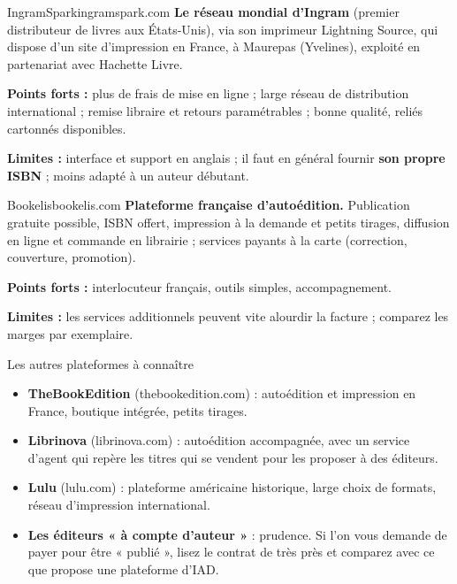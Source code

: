 \begin{fiche}{IngramSpark}{ingramspark.com}
\textbf{Le réseau mondial d’Ingram} (premier distributeur de livres aux
États-Unis), via son imprimeur Lightning Source, qui dispose d’un site
d’impression en France, à Maurepas (Yvelines), exploité en partenariat
avec Hachette Livre.\par
\textbf{Points forts :} plus de frais de mise en ligne ; large réseau
de distribution international ; remise libraire et retours
paramétrables ; bonne qualité, reliés cartonnés disponibles.\par
\textbf{Limites :} interface et support en anglais ; il faut en général
fournir \textbf{son propre ISBN} ; moins adapté à un auteur débutant.
\end{fiche}

\begin{fiche}{Bookelis}{bookelis.com}
\textbf{Plateforme française d’autoédition.} Publication gratuite
possible, ISBN offert, impression à la demande et petits tirages,
diffusion en ligne et commande en librairie ; services payants à la
carte (correction, couverture, promotion).\par
\textbf{Points forts :} interlocuteur français, outils simples,
accompagnement.\par
\textbf{Limites :} les services additionnels peuvent vite alourdir la
facture ; comparez les marges par exemplaire.
\end{fiche}

\begin{fiche}{Les autres plateformes à connaître}{}
\begin{itemize}
  \item \textbf{TheBookEdition} (thebookedition.com) : autoédition et
        impression en France, boutique intégrée, petits tirages.
  \item \textbf{Librinova} (librinova.com) : autoédition accompagnée,
        avec un service d’agent qui repère les titres qui se vendent pour
        les proposer à des éditeurs.
  \item \textbf{Lulu} (lulu.com) : plateforme américaine historique,
        large choix de formats, réseau d’impression international.
  \item \textbf{Les éditeurs « à compte d’auteur »} : prudence. Si l’on
        vous demande de payer pour être « publié », lisez le contrat de
        très près et comparez avec ce que propose une plateforme d’IAD.
\end{itemize}
\end{fiche}


